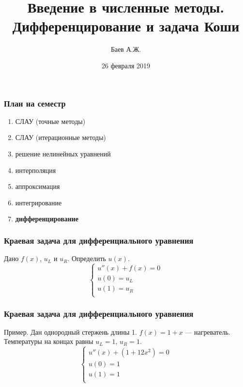 \documentclass[10pt]{beamer}
\author{Баев А.Ж.}
\title{Введение в численные методы. \\ Дифференцирование и задача Коши}
\institute{Казахстанский филиал МГУ}
\date{26 февраля 2019}
\begin{document}
\maketitle


\begin{frame}[fragile]
\frametitle{План на семестр}

\begin{enumerate}
\item СЛАУ (точные методы)
\item СЛАУ (итерационные методы)
\item решение нелинейных уравнений
\item интерполяция
\item аппроксимация
\item интегрирование
\item \textbf{дифференцирование}
\end{enumerate}
\end{frame}


\begin{frame}[fragile]
\frametitle{Краевая задача для дифференциального уравнения}
Дано $f(x)$, $u_L$ и $u_R$. Определить $u(x)$.
$$
\begin{cases}
u''(x) + f(x) = 0\\
u(0) = u_L\\
u(1) = u_R\\
\end{cases}
$$
\end{frame}

\begin{frame}[fragile]
\frametitle{Краевая задача для дифференциального уравнения}
Пример. Дан однородный стержень длины 1. $f(x) = 1 + x$ --- нагреватель. Температуры на концах равны $u_L = 1$, $u_R = 1$.
$$
\begin{cases}
u''(x) + (1 + 12 x^2) = 0\\
u(0) = 1\\
u(1) = 1\\
\end{cases}
$$

\begin{center}
\end{center}
\end{frame}
\end{document}

